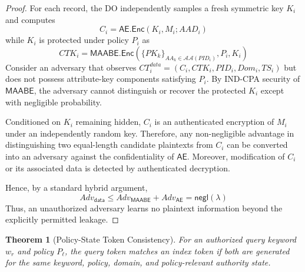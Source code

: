 \documentclass{ieeetj}
\theoremstyle{ieee-style}
\newtheorem{theorem}{Theorem}[subsection]
\begin{document}
\begin{proof}
For each record, the DO independently samples a fresh symmetric key
$K_i$ and computes
\begin{equation}
C_i=\mathsf{AE.Enc}(K_i,M_i;AAD_i)
\end{equation}
while $K_i$ is protected under policy $P_i$ as
\begin{equation}
CTK_i=
\mathsf{MAABE.Enc}
(\{PK_k\}_{AA_k\in\mathcal{AA}(PID_i)},P_i,K_i)
\end{equation}
Consider an adversary that observes
$CT_i^{data}=(C_i,CTK_i,PID_i,Dom_i,TS_i)$ but does not possess
attribute-key components satisfying $P_i$. By IND-CPA security of
$\mathsf{MAABE}$, the adversary cannot distinguish or recover the protected $K_i$ except with negligible probability.

Conditioned on $K_i$ remaining hidden, $C_i$ is an authenticated
encryption of $M_i$ under an independently random key. Therefore, any non-negligible advantage in distinguishing two equal-length candidate
plaintexts from $C_i$ can be converted into an adversary against the
confidentiality of $\mathsf{AE}$. Moreover, modification of $C_i$ or its
associated data is detected by authenticated decryption.

Hence, by a standard hybrid argument,
\begin{equation}
Adv_{\mathsf{data}}
\le
Adv_{\mathsf{MAABE}}
+
Adv_{\mathsf{AE}}
=
\mathsf{negl}(\lambda)
\end{equation}
Thus, an unauthorized adversary learns no plaintext information beyond
the explicitly permitted leakage.
\end{proof}


\begin{theorem}[Policy-State Token Consistency]
For an authorized query keyword $w_r$ and policy $P_\ell$, the query
token matches an index token if both are generated for the same keyword,
policy, domain, and policy-relevant authority state.
\end{theorem}
\end{document}
